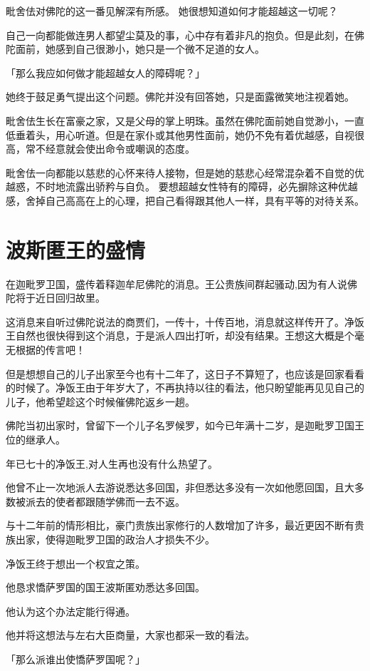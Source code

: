 \documentclass[twoside,openany]{book}
\begin{document}
毗舍佉对佛陀的这一番见解深有所感。
她很想知道如何才能超越这一切呢？

自己一向都能做连男人都望尘莫及的事，心中存有着非凡的抱负。但是此刻，在佛陀面前，她感到自己很渺小，她只是一个微不足道的女人。

「那么我应如何做才能超越女人的障碍呢？」

她终于鼓足勇气提出这个问题。佛陀并没有回答她，只是面露微笑地注视着她。

毗舍佉生长在富豪之家，又是父母的掌上明珠。虽然在佛陀面前她自觉渺小，一直低垂着头，用心听道。但是在家仆或其他男性面前，她仍不免有着优越感，自视很高，常不经意就会使出命令或嘲讽的态度。

毗舍佉一向都能以慈悲的心怀来待人接物，但是她的慈悲心经常混杂着不自觉的优越惑，不时地流露出骄矜与自负。
要想超越女性特有的障碍，必先摒除这种优越感，舍掉自己高高在上的心理，把自己看得跟其他人一样，具有平等的对待关系。

\section{波斯匿王的盛情}\label{sec7.3}

在迦毗罗卫国，盛传着释迦牟尼佛陀的消息。王公贵族间群起骚动,因为有人说佛陀将于近日回归故里。

这消息来自听过佛陀说法的商贾们，一传十，十传百地，消息就这样传开了。净饭王自然也很快得到这个消息，于是派人四出打听，却没有结果。王想这大概是个毫无根据的传言吧！

但是想想自己的儿子出家至今也有十二年了，这日子不算短了，也应该是回家看看的时候了。净饭王由于年岁大了，不再执持以往的看法，他只盼望能再见见自己的儿子，他希望趁这个时候催佛陀返乡一趟。

佛陀当初出家时，曾留下一个儿子名罗候罗，如今已年满十二岁，是迦毗罗卫国王位的继承人。

年已七十的净饭王,对人生再也没有什么热望了。

他曾不止一次地派人去游说悉达多回国，非但悉达多没有一次如他愿回国，且大多数被派去的使者都跟随学佛而一去不返。

与十二年前的情形相比，豪门贵族出家修行的人数增加了许多，最近更因不断有贵族出家，使得迦毗罗卫国的政治人才损失不少。

净饭王终于想出一个权宜之策。

他恳求憍萨罗国的国王波斯匿劝悉达多回国。

他认为这个办法定能行得通。

他并将这想法与左右大臣商量，大家也都采一致的看法。

「那么派谁出使憍萨罗国呢？」
\end{document}
